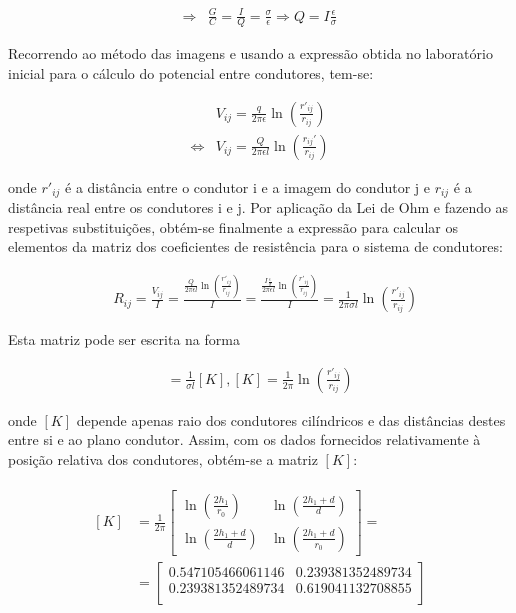 \documentclass[portuguese, a4paper, titlepage]{article}
\newcommand{\eq}{\Leftrightarrow} %
\begin{document}
	\begin{align*}
		\Rightarrow &\frac{G}{C} = \frac{I}{Q} = \frac{\sigma}{\epsilon} \Rightarrow Q = I\frac{\epsilon}{\sigma}
	\end{align*}
	
	Recorrendo ao método das imagens e usando a expressão obtida no laboratório inicial para o cálculo do potencial entre condutores, tem-se:
	
	\begin{align*}
		&V_{ij} =  \frac{q}{2\pi\epsilon} \ln\left(\frac{r'_{ij} }{r_{ij} }\right) \\
		\eq &V_{ij}  = \frac{Q}{2\pi\epsilon l} \ln\left(\frac{r_{ij} '}{r_{ij} }\right)
	\end{align*}
	
	onde $r'_{ij}$ é a distância entre o condutor i e a imagem do condutor j e $r_{ij}$ é a distância real entre os condutores i e j. Por aplicação da Lei de Ohm e fazendo as respetivas substituições, obtém-se finalmente a expressão para calcular os elementos da matriz dos coeficientes de resistência para o sistema de condutores:
	
	\begin{align*}
		&R_{ij}  = \frac{V_{ij} }{I} = \frac{\frac{Q}{2\pi\epsilon l} \ln\left(\frac{r'_{ij} }{r_{ij} }\right)}{I} = \frac{\frac{I\frac{\epsilon}{\sigma}}{2\pi\epsilon l} \ln\left(\frac{r'_{ij} }{r_{ij} }\right)}{I} = \frac{1}{2\pi\sigma l}\ln\left(\frac{r'_{ij} }{r_{ij} }\right)
	\end{align*}
	
	Esta matriz pode ser escrita na forma
	
	\begin{align*}
		[R] = \frac{1}{\sigma l} [K], [K] = \frac{1}{2 \pi} \ln\left(\frac{r'_{ij} }{r_{ij} }\right) 
	\end{align*}
	
	onde $[K]$ depende apenas raio dos condutores cilíndricos e das distâncias destes entre si e ao plano condutor. Assim, com os dados fornecidos relativamente à posição relativa dos condutores, obtém-se a matriz $[K]$:

	\begin{align*}
		\begin{split}
		[K] &= \frac{1}{2\pi}
		\begin{bmatrix}
			\ln\left(\frac{2h_1}{r_0}\right) & \ln\left(\frac{2h_1 + d}{d}\right)  \\
			\ln\left(\frac{2h_1 + d}{d}\right) & \ln\left(\frac{2h_1 + d}{r_0}\right)  
		\end{bmatrix} = \\
		&= \begin{bmatrix}
			0.547105466061146 & 0.239381352489734 \\
			0.239381352489734 & 0.619041132708855 \\
		\end{bmatrix}
		\end{split}
		\end{align*}
	
\end{document}
